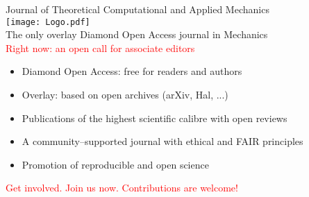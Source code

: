 \documentclass[8pt,red]{beamer}
\begin{document}

    
\begin{frame}
\begin{center}
    \large{Journal of Theoretical Computational and Applied Mechanics}\\[2mm]
    
    \texttt{[image: Logo.pdf]}\\[3mm]

    {The only overlay Diamond Open Access journal in Mechanics}\\[1mm]

    \large\textcolor{red}{Right now: an open call for associate editors}


\end{center}
\vspace{1mm}
\begin{itemize}
    \item Diamond Open Access: free for readers and authors
    \item Overlay: based on open archives (arXiv, Hal, ...)
    \item Publications of the highest scientific calibre with open reviews
    \item A community--supported journal with ethical and  FAIR principles
    \item Promotion of reproducible and open science
\end{itemize}
\vspace{1mm}
\begin{center}

  \large\textcolor{red}{Get involved. Join us now. Contributions are welcome!}\\
  
  

\end{center}
\end{frame}


 
\def\newblock{}
{\scriptsize
\printbibliography
}
\end{document}
